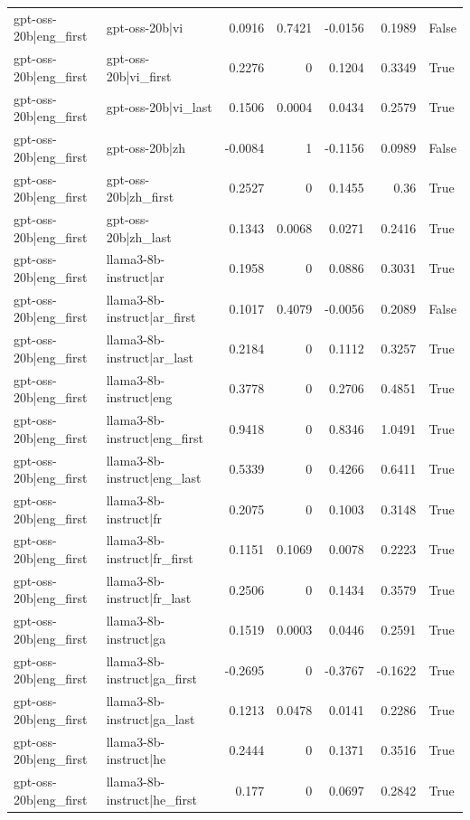 \begin{table}
\begin{tabular}{l l r r r r l}
gpt-oss-20b|eng_first & gpt-oss-20b|vi & 0.0916 & 0.7421 & -0.0156 & 0.1989 & False \\
gpt-oss-20b|eng_first & gpt-oss-20b|vi_first & 0.2276 & 0 & 0.1204 & 0.3349 & True \\
gpt-oss-20b|eng_first & gpt-oss-20b|vi_last & 0.1506 & 0.0004 & 0.0434 & 0.2579 & True \\
gpt-oss-20b|eng_first & gpt-oss-20b|zh & -0.0084 & 1 & -0.1156 & 0.0989 & False \\
gpt-oss-20b|eng_first & gpt-oss-20b|zh_first & 0.2527 & 0 & 0.1455 & 0.36 & True \\
gpt-oss-20b|eng_first & gpt-oss-20b|zh_last & 0.1343 & 0.0068 & 0.0271 & 0.2416 & True \\
gpt-oss-20b|eng_first & llama3-8b-instruct|ar & 0.1958 & 0 & 0.0886 & 0.3031 & True \\
gpt-oss-20b|eng_first & llama3-8b-instruct|ar_first & 0.1017 & 0.4079 & -0.0056 & 0.2089 & False \\
gpt-oss-20b|eng_first & llama3-8b-instruct|ar_last & 0.2184 & 0 & 0.1112 & 0.3257 & True \\
gpt-oss-20b|eng_first & llama3-8b-instruct|eng & 0.3778 & 0 & 0.2706 & 0.4851 & True \\
gpt-oss-20b|eng_first & llama3-8b-instruct|eng_first & 0.9418 & 0 & 0.8346 & 1.0491 & True \\
gpt-oss-20b|eng_first & llama3-8b-instruct|eng_last & 0.5339 & 0 & 0.4266 & 0.6411 & True \\
gpt-oss-20b|eng_first & llama3-8b-instruct|fr & 0.2075 & 0 & 0.1003 & 0.3148 & True \\
gpt-oss-20b|eng_first & llama3-8b-instruct|fr_first & 0.1151 & 0.1069 & 0.0078 & 0.2223 & True \\
gpt-oss-20b|eng_first & llama3-8b-instruct|fr_last & 0.2506 & 0 & 0.1434 & 0.3579 & True \\
gpt-oss-20b|eng_first & llama3-8b-instruct|ga & 0.1519 & 0.0003 & 0.0446 & 0.2591 & True \\
gpt-oss-20b|eng_first & llama3-8b-instruct|ga_first & -0.2695 & 0 & -0.3767 & -0.1622 & True \\
gpt-oss-20b|eng_first & llama3-8b-instruct|ga_last & 0.1213 & 0.0478 & 0.0141 & 0.2286 & True \\
gpt-oss-20b|eng_first & llama3-8b-instruct|he & 0.2444 & 0 & 0.1371 & 0.3516 & True \\
gpt-oss-20b|eng_first & llama3-8b-instruct|he_first & 0.177 & 0 & 0.0697 & 0.2842 & True \\

\end{tabular}
\end{table}
